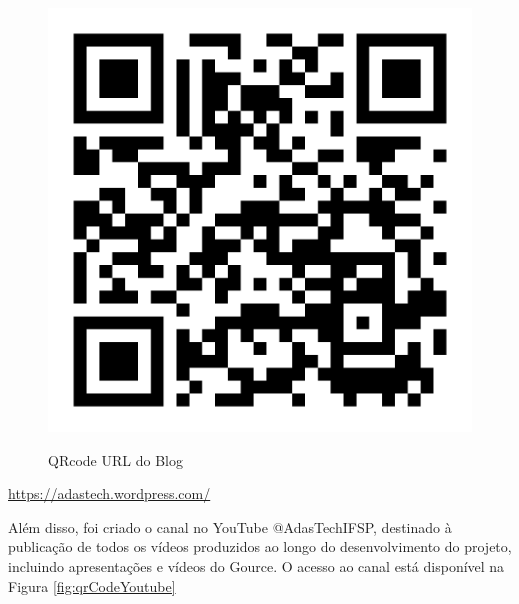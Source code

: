 \begin{figure}[ht]
        \centering
        \href{https://adastech.wordpress.com/}{
        \includegraphics[scale=0.5]{images/qrCode-blog.png}
        }        
        \caption{QRcode URL do Blog}
        \label{fig:qrcodeBlog}
    \end{figure}
\href{https://adastech.wordpress.com/}{https://adastech.wordpress.com/}


\newpage
Além disso, foi criado o canal no YouTube @AdasTechIFSP, destinado à publicação de todos os vídeos produzidos ao longo do desenvolvimento do projeto, incluindo apresentações e vídeos do Gource. O acesso ao canal está disponível na Figura \ref{fig:qrCodeYoutube}

